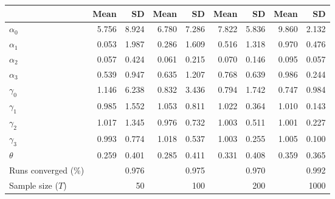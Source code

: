 
\begin{tabular}[t]{lrrrrrrrr}
\toprule
  & Mean & SD & Mean  & SD  & Mean   & SD   & Mean    & SD   \\
\midrule
$\alpha_{0}$ & 5.756 & 8.924 & 6.780 & 7.286 & 7.822 & 5.836 & 9.860 & 2.132\\
$\alpha_{1}$ & 0.053 & 1.987 & 0.286 & 1.609 & 0.516 & 1.318 & 0.970 & 0.476\\
$\alpha_{2}$ & 0.057 & 0.424 & 0.061 & 0.215 & 0.070 & 0.146 & 0.095 & 0.057\\
$\alpha_{3}$ & 0.539 & 0.947 & 0.635 & 1.207 & 0.768 & 0.639 & 0.986 & 0.244\\
$\gamma_{0}$ & 1.146 & 6.238 & 0.832 & 3.436 & 0.794 & 1.742 & 0.747 & 0.984\\
$\gamma_{1}$ & 0.985 & 1.552 & 1.053 & 0.811 & 1.022 & 0.364 & 1.010 & 0.143\\
$\gamma_{2}$ & 1.017 & 1.345 & 0.976 & 0.732 & 1.003 & 0.511 & 1.001 & 0.227\\
$\gamma_{3}$ & 0.993 & 0.774 & 1.018 & 0.537 & 1.003 & 0.255 & 1.005 & 0.100\\
$\theta$ & 0.259 & 0.401 & 0.285 & 0.411 & 0.331 & 0.408 & 0.359 & 0.365\\
Runs converged (\%) &  & 0.976 &  & 0.975 &  & 0.970 &  & 0.992\\
Sample size ($T$) &  & 50 &  & 100 &  & 200 &  & 1000\\
\bottomrule
\end{tabular}
